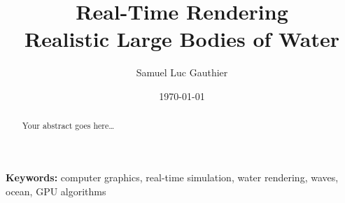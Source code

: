 \title{\textbf{Real-Time Rendering}\\\Large{Realistic Large Bodies of Water}}

\author{\normalsize{Samuel Luc Gauthier}}
\date{\normalsize{\today}}
\maketitle

\begin{abstract}
Your abstract goes here\ldots\\
\end{abstract}

\small{{\bf Keywords:} computer graphics, real-time simulation, water rendering,
waves, ocean, GPU algorithms}
